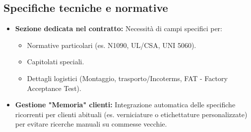 \documentclass[12pt, a4paper]{article} %
\begin{document}
\subsection{Specifiche tecniche e normative}
\begin{itemize}
    \item \textbf{Sezione dedicata nel contratto:} Necessità di campi specifici per:
    \begin{itemize}
        \item Normative particolari (es. N1090, UL/CSA, UNI 5060).
        \item Capitolati speciali.
        \item Dettagli logistici (Montaggio, trasporto/Incoterms, FAT - Factory Acceptance Test).
    \end{itemize}
    \item \textbf{Gestione "Memoria" clienti:} Integrazione automatica delle specifiche ricorrenti per clienti abituali (es. verniciature o etichettature personalizzate) per evitare ricerche manuali su commesse vecchie.
\end{itemize}
\end{document}
